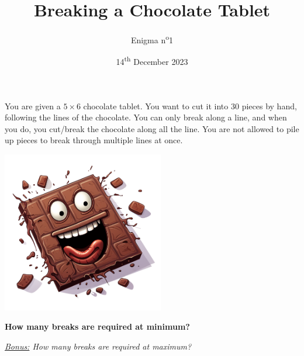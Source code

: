 \documentclass[a4paper, top=10mm]{article}
\title{\textbf{\huge{Breaking a Chocolate Tablet}}}
\author{Enigma n\textsuperscript{o}1}
\date{14\textsuperscript{th} December 2023}
\begin{document}
	\maketitle
	
	You are given a $5 \times 6$ chocolate tablet.
	You want to cut it into $30$ pieces by hand, following the lines of the chocolate.
	You can only break along a line, and when you do, you cut/break the chocolate along all the line.
	You are not allowed to pile up pieces to break through multiple lines at once.
	
	\begin{center}
		\includegraphics[height=200pt]{01chocolate_cartoon.png}
	\end{center}
	
	\textbf{How many breaks are required at minimum?}
	
	\vspace{2cm}
	
	\textit{\underline{Bonus:} How many breaks are required at maximum?}
	
	
\end{document}
